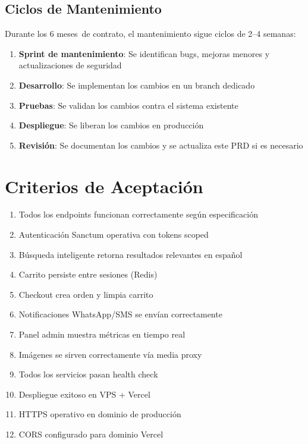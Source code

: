 \documentclass[11pt,a4paper]{article}
\newcommand{\contractperiod}{6 meses}
\begin{document}
\subsection{Ciclos de Mantenimiento}

Durante los \contractperiod\ de contrato, el mantenimiento sigue ciclos de 2--4 semanas:

\begin{enumerate}
    \item \textbf{Sprint de mantenimiento}: Se identifican bugs, mejoras menores y actualizaciones de seguridad
    \item \textbf{Desarrollo}: Se implementan los cambios en un branch dedicado
    \item \textbf{Pruebas}: Se validan los cambios contra el sistema existente
    \item \textbf{Despliegue}: Se liberan los cambios en producción
    \item \textbf{Revisión}: Se documentan los cambios y se actualiza este PRD si es necesario
\end{enumerate}

\section{Criterios de Aceptación}

\begin{enumerate}
    \item Todos los endpoints funcionan correctamente según especificación
    \item Autenticación Sanctum operativa con tokens scoped
    \item Búsqueda inteligente retorna resultados relevantes en español
    \item Carrito persiste entre sesiones (Redis)
    \item Checkout crea orden y limpia carrito
    \item Notificaciones WhatsApp/SMS se envían correctamente
    \item Panel admin muestra métricas en tiempo real
    \item Imágenes se sirven correctamente vía media proxy
    \item Todos los servicios pasan health check
    \item Despliegue exitoso en VPS + Vercel
    \item HTTPS operativo en dominio de producción
    \item CORS configurado para dominio Vercel
\end{enumerate}
\end{document}
